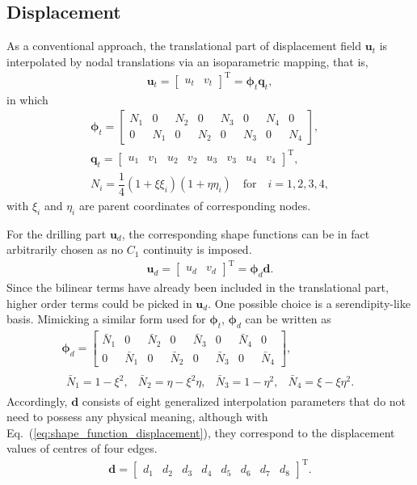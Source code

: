 \documentclass[3p,sort&compress,review,11pt]{elsarticle}
\newcommand*{\mT}{\mathrm{T}}
\newcommand*{\eqsref}[1]{Eq.~(\ref{#1})}
\newcommand*{\mb}{\bm}
\begin{document}
\subsection{Displacement}
As a conventional approach, the translational part of displacement field $\mb{u}_t$ is interpolated by nodal translations via an isoparametric mapping, that is,
\begin{gather}
\mb{u}_t=\begin{bmatrix}u_t&v_t\end{bmatrix}^\mT=\mb{\phi}_t\mb{q}_t,
\end{gather}
in which
\begin{gather*}
\mb{\phi}_t=\begin{bmatrix}
N_1&0&N_2&0&N_3&0&N_4&0\\
0&N_1&0&N_2&0&N_3&0&N_4
\end{bmatrix},\\
\mb{q}_t=\begin{bmatrix}
u_1&v_1&u_2&v_2&u_3&v_3&u_4&v_4
\end{bmatrix}^\mT,\\
N_i=\dfrac{1}{4}\left(1+\xi\xi_i\right)\left(1+\eta\eta_i\right)\quad\text{for}\quad{}i=1,2,3,4,
\end{gather*}
with $\xi_i$ and $\eta_i$ are parent coordinates of corresponding nodes.

For the drilling part $\mb{u}_d$, the corresponding shape functions can be in fact arbitrarily chosen as no $C_1$ continuity is imposed.
\begin{gather}\label{eq:interpolation_displacement}
\mb{u}_d=\begin{bmatrix}u_d&v_d\end{bmatrix}^\mT=\mb{\phi}_d\mb{d}.
\end{gather}
Since the bilinear terms have already been included in the translational part, higher order terms could be picked in $\mb{u}_d$. One possible choice is a serendipity-like basis. Mimicking a similar form used for $\mb{\phi}_t$, $\mb{\phi}_d$ can be written as
\begin{gather}
\mb{\phi}_d=\begin{bmatrix}
\bar{N}_1&0&\bar{N}_2&0&\bar{N}_3&0&\bar{N}_4&0\\
0&\bar{N}_1&0&\bar{N}_2&0&\bar{N}_3&0&\bar{N}_4
\end{bmatrix},\\\label{eq:shape_function_displacement}
\begin{array}{llll}
\bar{N}_1=1-\xi^2,&\bar{N}_2=\eta-\xi^2\eta,&\bar{N}_3=1-\eta^2,&\bar{N}_4=\xi-\xi\eta^2.
\end{array}
\end{gather}
Accordingly, $\mb{d}$ consists of eight generalized interpolation parameters that do not need to possess any physical meaning, although with \eqsref{eq:shape_function_displacement}, they correspond to the displacement values of centres of four edges.
\begin{gather*}
\mb{d}=\begin{bmatrix}
d_1&d_2&d_3&d_4&d_5&d_6&d_7&d_8
\end{bmatrix}^\mT.
\end{gather*}
\end{document}
